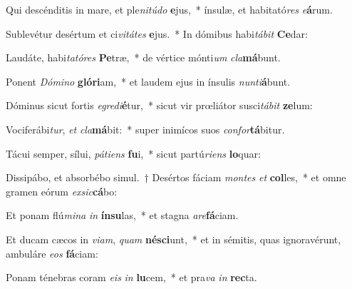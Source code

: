 \item Qui descénditis in mare, et ple\textit{ni}\textit{tú}\textit{do} \textbf{e}jus,~* ínsulæ, et habitató\textit{res} \textit{e}\textbf{á}rum.
\item Sublevétur desértum et ci\textit{vi}\textit{tá}\textit{tes} \textbf{e}jus.~* In dómibus habi\textit{tá}\textit{bit} \textbf{Ce}dar:
\item Laudáte, habi\textit{ta}\textit{tó}\textit{res} \textbf{Pe}træ,~* de vértice mónti\textit{um} \textit{cla}\textbf{má}bunt.
\item Ponent \textit{Dó}\textit{mi}\textit{no} \textbf{gló}\textbf{ri}am,~* et laudem ejus in ínsulis \textit{nun}\textit{ti}\textbf{á}bunt.
\item Dóminus sicut fortis \textit{e}\textit{gre}\textit{di}\textbf{é}tur,~* sicut vir prœliátor susci\textit{tá}\textit{bit} \textbf{ze}lum:
\item Vociferábi\textit{tur}, \textit{et} \textit{cla}\textbf{má}bit:~* super inimícos suos \textit{con}\textit{for}\textbf{tá}bitur.
\item Tácui semper, sílui, \textit{pá}\textit{ti}\textit{ens} \textbf{fu}i,~* sicut partú\textit{ri}\textit{ens} \textbf{lo}quar:
\item Dissipábo, et absorbébo simul.~† Desértos fáciam \textit{mon}\textit{tes} \textit{et} \textbf{col}les,~* et omne gramen eórum \textit{ex}\textit{sic}\textbf{cá}bo:
\item Et ponam flú\textit{mi}\textit{na} \textit{in} \textbf{ín}\textbf{su}las,~* et stagna \textit{a}\textit{re}\textbf{fá}ciam.
\item Et ducam cæcos in \textit{vi}\textit{am}, \textit{quam} \textbf{né}\textbf{sci}unt,~* et in sémitis, quas ignoravérunt, ambuláre \textit{e}\textit{os} \textbf{fá}ciam:
\item Ponam ténebras coram \textit{e}\textit{is} \textit{in} \textbf{lu}cem,~* et pra\textit{va} \textit{in} \textbf{rec}ta.
